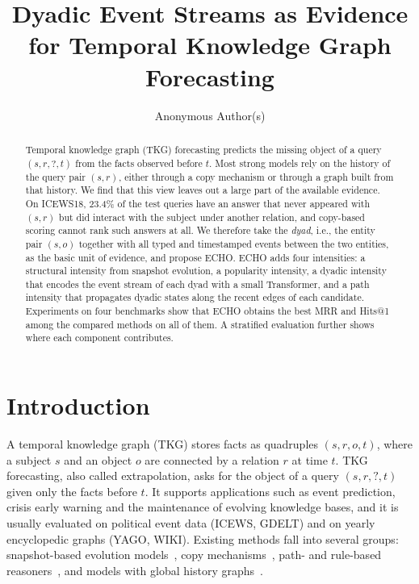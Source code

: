 \documentclass[runningheads]{llncs}
\newcommand{\model}{ECHO}
\begin{document}
\title{Dyadic Event Streams as Evidence for Temporal Knowledge Graph Forecasting}

\author{Anonymous Author(s)}

\maketitle

\begin{abstract}
Temporal knowledge graph (TKG) forecasting predicts the missing object of a query $(s, r, ?, t)$ from the facts observed before $t$. Most strong models rely on the history of the query pair $(s, r)$, either through a copy mechanism or through a graph built from that history. We find that this view leaves out a large part of the available evidence. On ICEWS18, 23.4\% of the test queries have an answer that never appeared with $(s, r)$ but did interact with the subject under another relation, and copy-based scoring cannot rank such answers at all. We therefore take the \emph{dyad}, i.e., the entity pair $(s, o)$ together with all typed and timestamped events between the two entities, as the basic unit of evidence, and propose \model{}. \model{} adds four intensities: a structural intensity from snapshot evolution, a popularity intensity, a dyadic intensity that encodes the event stream of each dyad with a small Transformer, and a path intensity that propagates dyadic states along the recent edges of each candidate. Experiments on four benchmarks show that \model{} obtains the best MRR and Hits@1 among the compared methods on all of them. A stratified evaluation further shows where each component contributes.

\end{abstract}

\section{Introduction}
\label{sec:intro}

A temporal knowledge graph (TKG) stores facts as quadruples $(s, r, o, t)$, where a subject $s$ and an object $o$ are connected by a relation $r$ at time $t$. TKG forecasting, also called extrapolation, asks for the object of a query $(s, r, ?, t)$ given only the facts before $t$. It supports applications such as event prediction, crisis early warning and the maintenance of evolving knowledge bases, and it is usually evaluated on political event data (ICEWS, GDELT) and on yearly encyclopedic graphs (YAGO, WIKI). Existing methods fall into several groups: snapshot-based evolution models~\cite{jin2020renet,li2021regcn,li2022cen,dong2025dimnet}, copy mechanisms~\cite{zhu2021cygnet,xu2023cenet}, path- and rule-based reasoners~\cite{han2021xerte,sun2021titer,liu2022tlogic,dong2023daemon,dong2024tipnn}, and models with global history graphs~\cite{li2022tirgn,chen2024logcl,chen2025cogntke}.
\end{document}
